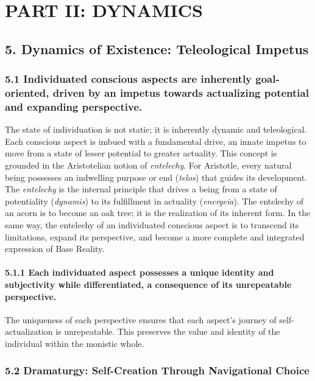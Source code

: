 \section*{PART II: DYNAMICS}


\subsection*{5. Dynamics of Existence: Teleological Impetus}


\subsubsection*{5.1 Individuated conscious aspects are inherently goal-oriented, driven by an impetus towards actualizing potential and expanding perspective.}


The state of individuation is not static; it is inherently dynamic and teleological. Each conscious aspect is imbued with a fundamental drive, an innate impetus to move from a state of lesser potential to greater actuality. This concept is grounded in the Aristotelian notion of \textit{entelechy}. For Aristotle, every natural being possesses an indwelling purpose or end (\textit{telos}) that guides its development. The \textit{entelechy} is the internal principle that drives a being from a state of potentiality (\textit{dynamis}) to its fulfillment in actuality (\textit{energeia}). The entelechy of an acorn is to become an oak tree; it is the realization of its inherent form. In the same way, the entelechy of an individuated conscious aspect is to transcend its limitations, expand its perspective, and become a more complete and integrated expression of Base Reality.


\paragraph*{5.1.1 Each individuated aspect possesses a unique identity and subjectivity while differentiated, a consequence of its unrepeatable perspective.}


The uniqueness of each perspective ensures that each aspect's journey of self-actualization is unrepeatable. This preserves the value and identity of the individual within the monistic whole.


\subsubsection*{5.2 Dramaturgy: Self-Creation Through Navigational Choice}


